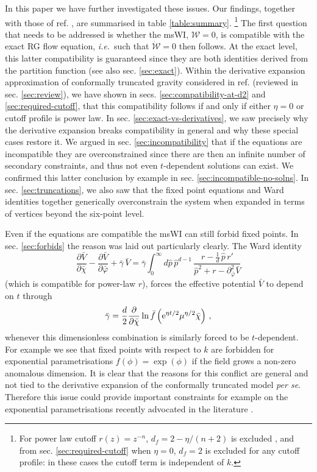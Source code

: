 \documentclass[11pt]{book} %
\newcommand\ie{\textit{i.e.}\ }
\newcommand{\bc}{\bar \chi}
\newcommand{\bV}{\bar V}
\newcommand{\be}{\begin{equation}}
\newcommand{\ee}{\end{equation}}
\begin{document}
In this paper we have further investigated these issues.
Our findings, together with those of ref. \cite{Dietz:2015owa}, are summarised in table \ref{table:summary}.
\footnote{For power law cutoff  $r(z)=z^{-n}$, $d_f = 2-\eta/(n+2)$ is excluded \cite{Dietz:2015owa},
and from sec. \ref{sec:required-cutoff} when $\eta=0$,  $d_f=2$ is excluded for any cutoff profile:
in these cases the cutoff term is independent of $k$.} The first question that needs to be addressed is whether the msWI,
$\mathcal{W}=0$, is compatible with the exact RG flow equation, \ie such that $\dot{\mathcal{W}}=0$ then follows.
At the exact level, this latter compatibility is guaranteed since they are both identities derived from the partition function
(see also sec. \ref{sec:exact}).
Within the derivative expansion approximation of conformally truncated gravity considered in ref.
\cite{Dietz:2015owa} (reviewed in sec. \ref{sec:review}),
we have shown  in secs. \ref{sec:compatibility-at-d2} and \ref{sec:required-cutoff},
that this compatibility follows if and only if either $\eta=0$ or cutoff profile is power law.
In sec. \ref{sec:exact-vs-derivatives}, we saw precisely why the derivative expansion breaks compatibility
in general and why these special cases restore it.
We argued in sec. \ref{sec:incompatibility} that if the equations are incompatible they are overconstrained
since there are then an infinite number of secondary constraints, and thus not even $t$-dependent solutions can exist.
We confirmed this latter conclusion by example in sec. \ref{sec:incompatible-no-solns}. In sec. \ref{sec:truncations},
we also saw that the fixed point equations and Ward identities together generically overconstrain the system when
expanded in terms of vertices beyond the six-point level.

Even if the equations are compatible the msWI can still forbid fixed points. In sec. \ref{sec:forbids} the reason was laid out particularly clearly. The Ward identity
\be
\frac{\partial \bar V}{\partial \bar\chi} - \frac{\partial \bar V}{\partial \bar\varphi} + \bar \gamma \, \bar V = \bar \gamma
\int_0^{\infty} d\hat p \, \hat p^{d-1} \, \frac{r - \frac{1}{d} \, \hat p \, r'}{\hat p^2 + r - \partial^2_{\bar\varphi}\bar V}
\ee
(which is compatible for power-law $r$),
forces the effective potential $\bV$ to depend on $t$ through
\be
\bar{\gamma} = \frac{d}{2}\frac{\partial}{\partial\bc}\ln\bar{f}\left({\rm e}^{\eta t/2}\mu^{\eta/2}\bc\right)\,,
\ee
whenever this dimensionless combination is similarly forced to be $t$-dependent. For example  we see that fixed points with respect to $k$ are forbidden for exponential parametrisations $f(\phi)= \exp(\phi)$  if the field grows a non-zero anomalous dimension.  It is clear that the reasons for this conflict are general and not tied to the derivative expansion of the conformally truncated model \textit{per se}. Therefore this issue could provide important constraints for example on the exponential parametrisations recently advocated in the literature \cite{Demmel:2015zfa,Eichhorn:2013xr,Eichhorn:2015bna,Nink:2014yya,Percacci:2015wwa,Labus:2015ska,Ohta:2015efa,Gies:2015tca}.
\end{document}

